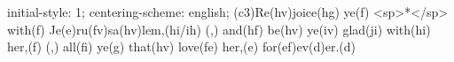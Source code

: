 initial-style: 1;
centering-scheme: english;
(c3)Re(hv)joice(hg) ye(f) <sp>*</sp> with(f) Je(e)ru(fv)sa(hv)lem,(hi/ih) (,) and(hf) be(hv) ye(iv) glad(ji) with(hi) her,(f) (,) all(fi) ye(g) that(hv) love(fe) her,(e) for(ef)ev(d)er.(d)
